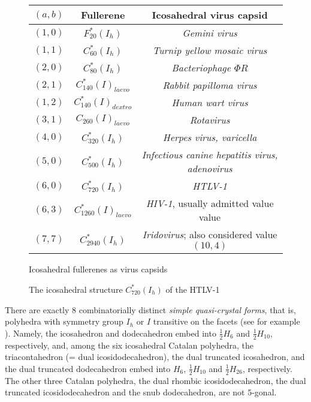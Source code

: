 \begin{figure}[htbp]
\begin{center}
\begin{tabular}{|c|c|c|} \hline
$(a,b)$ & Fullerene & Icosahedral virus capsid \\ \hline \hline
$(1,0)$ & $F^*_{20}(I_h)$ & {\it Gemini virus} \\ \hline
$(1,1)$ & $C^*_{60}(I_h)$ & {\it Turnip yellow mosaic virus} \\ \hline
$(2,0)$ & $C^*_{80}(I_h)$ & {\it Bacteriophage {\em $\Phi R$}} \\ \hline
$(2,1)$ & $C^*_{140}(I)_{laevo}$ & {\it Rabbit papilloma virus} \\ \hline
$(1,2)$ & $C^*_{140}(I)_{dextro}$ & {\it Human wart virus} \\ \hline
$(3,1)$ & $C_{260}(I)_{laevo}$ & {\it Rotavirus} \\ \hline
$(4,0)$ & $C^*_{320}(I_h)$ & {\it Herpes virus, varicella} \\ \hline
$(5,0)$ & $C^*_{500}(I_h)$ & {\it Infectious canine hepatitis virus, adenovirus} \\ \hline
$(6,0)$ & $C^*_{720}(I_h)$ & {\it HTLV-1}\\ \hline
$(6,3)$ & $C^*_{1260}(I)_{laevo}$ & {\it HIV-1}, {\small usually admitted value value}\\ \hline
$(7,7)$ & $C^*_{2940}(I_h)$ & {\it Iridovirus}; {\small also considered value $(10,4)$}\\ \hline
\end{tabular}
\caption{Icosahedral fullerenes as virus capsids}\label{virus}
\end{center}
\end{figure}
\begin{figure}[htbp]
\begin{center}
\caption{The icosahedral structure $C^*_{720}(I_h)$ of the HTLV-1}\label{aids}
\end{center}
\end{figure}

\begin{remark}
There are exactly 8 combinatorially distinct {\it simple
quasi-crystal forms}, that is, polyhedra with symmetry group 
$I_h$ or $I$ transitive on the facets (see for example \cite{ge92}).
Namely, the icosahedron and dodecahedron embed into $\frac{1}{2}H_6$
and $\frac{1}{2}H_{10}$, respectively, and, among the six icosahedral
Catalan polyhedra, the triacontahedron (= dual icosidodecahedron), the dual truncated 
icosahedron, and the dual truncated dodecahedron embed 
into $H_6$, $\frac{1}{2}H_{10}$ and $\frac{1}{2}H_{26}$, respectively.
The other three Catalan polyhedra, the dual rhombic icosidodecahedron, the dual truncated
icosidodecahedron and the snub dodecahedron, are not $5$-gonal.
\end{remark}

